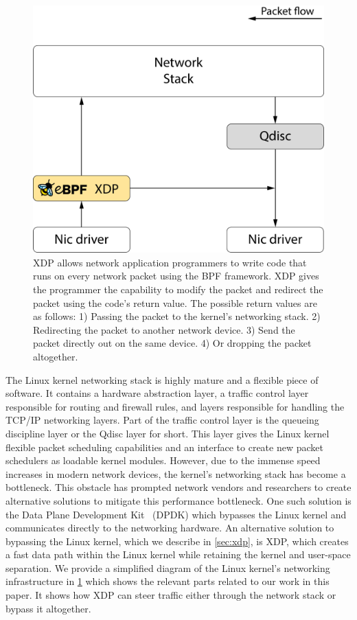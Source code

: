\documentclass[sigconf, nonacm]{acmart}
\begin{document}
\begin{figure}
  \includegraphics[width=0.6\linewidth]{network-overview.pdf}
  \caption{XDP allows network application programmers to write code that runs on every network packet using the BPF framework. XDP gives the programmer the capability to modify the packet and redirect the packet using the code's return value. The possible return values are as follows: 1) Passing the packet to the kernel's networking stack. 2) Redirecting the packet to another network device. 3) Send the packet directly out on the same device. 4) Or dropping the packet altogether.}
  \label{fig:network_overview}
\end{figure}

The Linux kernel networking stack is highly mature and a flexible piece of software. It contains a hardware abstraction layer, a traffic control layer responsible for routing and firewall rules, and layers responsible for handling the TCP/IP networking layers. Part of the traffic control layer is the queueing discipline layer or the Qdisc layer for short. This layer gives the Linux kernel flexible packet scheduling capabilities and an interface to create new packet schedulers as loadable kernel modules. However, due to the immense speed increases in modern network devices, the kernel's networking stack has become a bottleneck. This obstacle has prompted network vendors and researchers to create alternative solutions to mitigate this performance bottleneck. One such solution is the Data Plane Development Kit~\cite{dpdk} (DPDK) which bypasses the Linux kernel and communicates directly to the networking hardware. An alternative solution to bypassing the Linux kernel, which we describe in \cref{sec:xdp}, is XDP, which creates a fast data path within the Linux kernel while retaining the kernel and user-space separation. We provide a simplified diagram of the Linux kernel's networking infrastructure in \cref{fig:network_overview} which shows the relevant parts related to our work in this paper. It shows how XDP can steer traffic either through the network stack or bypass it altogether.
\end{document}
